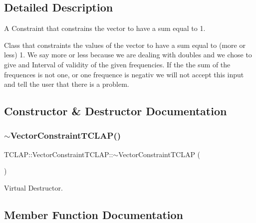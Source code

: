 \subsection{Detailed Description}
A Constraint that constrains the vector to have a sum equal to 1. 

Class that constraints the values of the vector to have a sum equal to (more or less) 1. We say more or less because we are dealing with doubles and we chose to give and Interval of validity of the given frequencies. If the the sum of the frequences is not one, or one frequence is negativ we will not accept this input and tell the user that there is a problem. 

\subsection{Constructor \& Destructor Documentation}
\hypertarget{class_t_c_l_a_p_1_1_vector_constraint_t_c_l_a_p_a7e7bc9274a2fec7590046e1ee3d162cc}{}\label{class_t_c_l_a_p_1_1_vector_constraint_t_c_l_a_p_a7e7bc9274a2fec7590046e1ee3d162cc} 
\subsubsection{\texorpdfstring{$\sim$\+Vector\+Constraint\+T\+C\+L\+A\+P()}{~VectorConstraintTCLAP()}}
{\footnotesize\ttfamily T\+C\+L\+A\+P\+::\+Vector\+Constraint\+T\+C\+L\+A\+P\+::$\sim$\+Vector\+Constraint\+T\+C\+L\+AP (\begin{DoxyParamCaption}{ }\end{DoxyParamCaption})\hspace{0.3cm}{\ttfamily [inline]}}



Virtual Destructor. 



\subsection{Member Function Documentation}
\hypertarget{class_t_c_l_a_p_1_1_vector_constraint_t_c_l_a_p_ab6af148ebdcd114490ff52e1c48af0c4}{}\label{class_t_c_l_a_p_1_1_vector_constraint_t_c_l_a_p_ab6af148ebdcd114490ff52e1c48af0c4} 

